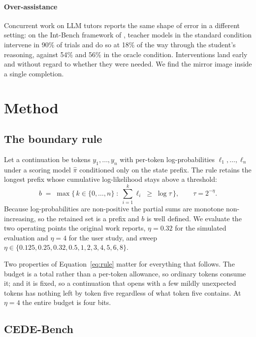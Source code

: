 \documentclass[10pt]{article}
\begin{document}
\paragraph{Over-assistance}
Concurrent work on LLM tutors reports the same shape of error in a different setting: on the
Int-Bench framework of \citet{intbench2026}, teacher models in the standard condition intervene in
90\% of trials and do so at 18\% of the way through the student's reasoning, against 54\% and 56\%
in the oracle condition. Interventions land early and without
regard to whether they were needed. We find the mirror image inside a single completion.

\section{Method}

\subsection{The boundary rule}

Let a continuation be tokens $y_1, \dots, y_n$ with per-token log-probabilities
$\ell_1, \dots, \ell_n$ under a scoring model $\hat\pi$ conditioned only on the state prefix. The
rule retains the longest prefix whose cumulative log-likelihood stays above a threshold:
\begin{equation}
b \;=\; \max \Big\{\, k \in \{0,\dots,n\} \;:\; \textstyle\sum_{i=1}^{k} \ell_i \;\geq\; \log \tau \,\Big\},
\qquad \tau = 2^{-\eta}.
\label{eq:rule}
\end{equation}
Because log-probabilities are non-positive the partial sums are monotone non-increasing, so the
retained set is a prefix and $b$ is well defined. We evaluate the two operating points the original
work reports, $\eta = 0.32$ for the simulated evaluation and $\eta = 4$ for the user study, and
sweep $\eta \in \{0.125, 0.25, 0.32, 0.5, 1, 2, 3, 4, 5, 6, 8\}$.

Two properties of Equation~\ref{eq:rule} matter for everything that follows. The budget is a total
rather than a per-token allowance, so ordinary tokens consume it; and it is fixed, so a continuation
that opens with a few mildly unexpected tokens has nothing left by token five regardless of what
token five contains. At $\eta = 4$ the entire budget is four bits.

\subsection{CEDE-Bench}
\end{document}
